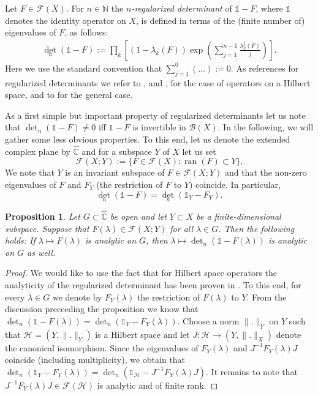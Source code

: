\documentclass[12pt,a4paper]{article}
\newtheorem{prop}[theorem]{Proposition}
\theoremstyle{definition}
\theoremstyle{remark}
\numberwithin{equation}{section}
\newcommand{\mn}{{\mathbb N}}
\newcommand{\mc}{{\mathbb C}}
\newcommand{\ran}{\operatorname{ran}}
\newcommand{\hil}{\mathcal{H}}
\newcommand{\bdd}{\mathcal{B}}
\begin{document}
Let $F \in \mathcal{F}(X)$. For $n \in \mn$ the \emph{$n$-regularized determinant}  of $\mathds{1}-F$, where $\mathds{1}$ denotes the identity operator on $X$, is defined in terms of the (finite number of) eigenvalues of $F$, as follows:
\begin{eqnarray*}
  {\det}_n(\mathds{1}-F):= 
      \prod_{k} \left[ (1-\lambda_k(F))\exp\left( \sum_{j=1}^{n-1} \frac{\lambda_k^j(F)}{j} \right) \right].
\end{eqnarray*}
Here we use the standard convention that $\sum_{j=1}^{0}(\ldots):=0$. As references for regularized determinants we refer to \cite{MR1009163},\cite{gohberg2} and \cite{simon}, for the case of operators on a Hilbert space, and to \cite{MR1744872} for the general case. 

As a first simple but important property of regularized determinants let us note that  ${\det}_n(\mathds{1}-F) \neq 0$ iff $\mathds{1}-F$ is invertible in $\bdd(X)$. In the following, we will gather some less obvious properties. To this end, let us denote the extended complex plane by $\hat \mc$ and for a subspace $Y$ of $X$ let us set 
 $$\mathcal{F}(X;Y) := \{ F \in \mathcal{F}(X): \ran(F) \subset Y\}.$$
We note that $Y$ is an invariant subspace of $F \in \mathcal{F}(X;Y)$ and that the non-zero eigenvalues of $F$ and $F_Y$ (the restriction of $F$ to $Y$) coincide. In particular,
$$ {\det}_n(\mathds{1}-F)={\det}_n(\mathds{1}_Y-F_Y).$$
\begin{prop}\label{prop01} 
Let $G \subset \hat \mc$ be open and let $Y \subset X$ be a finite-dimensional subspace. Suppose that  $F(\lambda) \in \mathcal{F}(X;Y)$ for all $\lambda \in G$. Then the following holds: If $\lambda \mapsto F(\lambda) $ is analytic on $G$, then $\lambda \mapsto \det_n(\mathds{1}-F(\lambda))$ is analytic on $G$ as well. 
\end{prop} 
\begin{proof}
We would like to use the fact that for Hilbert space operators the analyticity of the regularized determinant has been proven in \cite{MR0482328}. To this end, for every $\lambda \in G$ we denote by $F_Y(\lambda)$ the restriction of $F(\lambda)$ to $Y$. From the discussion preceeding the proposition we know that 
$ {\det}_n(\mathds{1}-F(\lambda))={\det}_n(\mathds{1}_Y-F_Y(\lambda))$. 
Choose a norm $\|.\|_Y$ on $Y$ such that $\hil=(Y,\|.\|_Y)$ is a Hilbert space and let $J : \hil \to (Y,\|.\|_X)$ denote the canonical isomorphism. Since the eigenvalues of $F_Y(\lambda)$ and $J^{-1}F_Y(\lambda)J$ coincide (including multiplicity), we obtain that $ {\det}_n(\mathds{1}_Y-F_Y(\lambda))= {\det}_n(\mathds{1}_\hil-J^{-1}F_Y(\lambda)J)$. It remains to note that $J^{-1}F_Y(\lambda)J \in \mathcal{F}(\hil)$ is analytic and of finite rank.

\end{proof} 
\end{document}
